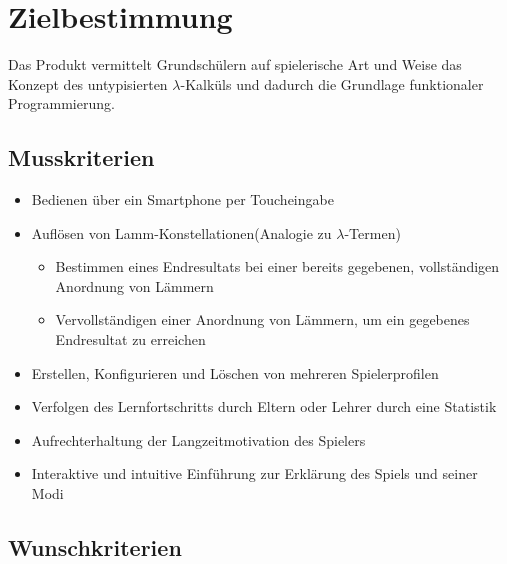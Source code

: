 \section{Zielbestimmung}

	Das Produkt vermittelt Grundschülern auf spielerische Art und Weise das Konzept des untypisierten $\lambda$-Kalküls und dadurch die Grundlage funktionaler Programmierung.   			    

\subsection{Musskriterien}

\begin{itemize}
	\item Bedienen über ein Smartphone per Toucheingabe
	\item Auflösen von Lamm-Konstellationen(Analogie zu $\lambda$-Termen)
	\begin{itemize}
		\item Bestimmen eines Endresultats bei einer bereits gegebenen, vollständigen Anordnung von Lämmern 
		\item Vervollständigen einer Anordnung von Lämmern, um ein gegebenes Endresultat zu erreichen
	\end{itemize}
	\item Erstellen, Konfigurieren und Löschen von mehreren Spielerprofilen
	\item Verfolgen des Lernfortschritts durch Eltern oder Lehrer durch eine Statistik
	\item Aufrechterhaltung der Langzeitmotivation des Spielers
	\item Interaktive und intuitive Einführung zur Erklärung des Spiels und seiner Modi
\end{itemize}

\subsection{Wunschkriterien}

